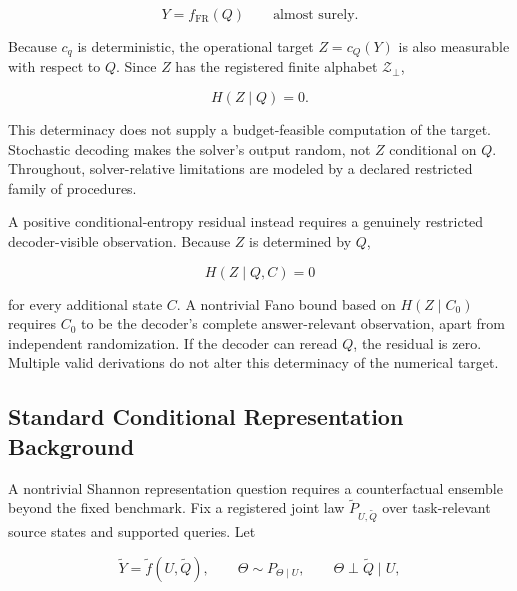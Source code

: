 \documentclass[10pt]{article} %
\providecommand{\1}{\mathbf{1}}  %
\theoremstyle{remark}
\theoremstyle{definition}
\begin{document}
\begin{equation}
Y=f_{\mathrm{FR}}(Q)
\qquad\text{almost surely}.
\label{eq:fixed-benchmark-determinacy}
\end{equation}

Because $c_q$ is deterministic, the operational target $Z=c_Q(Y)$ is also measurable with respect to $Q$. Since $Z$ has the registered finite alphabet $\mathcal Z_{\bot}$,

\begin{equation}
H(Z\mid Q)=0.
\label{eq:fixed-benchmark-zero-entropy}
\end{equation}

This determinacy does not supply a budget-feasible computation of the
target. Stochastic decoding makes the solver's output random, not $Z$
conditional on $Q$. Throughout, solver-relative limitations are modeled
by a declared restricted family of procedures.

A positive conditional-entropy residual instead requires a genuinely
restricted decoder-visible observation. Because $Z$ is determined by
$Q$,

\begin{equation}
H(Z\mid Q,C)=0
\label{eq:answer-determined-with-side-state}
\end{equation}

for every additional state $C$. A nontrivial Fano bound based on
$H(Z\mid C_0)$ requires $C_0$ to be the decoder's complete answer-relevant
observation, apart from independent randomization. If the decoder can
reread $Q$, the residual is zero. Multiple valid derivations do not
alter this determinacy of the numerical target.

\subsection{Standard Conditional Representation Background}
\label{subsec:representation-converses}

A nontrivial Shannon representation question requires a counterfactual ensemble beyond the fixed benchmark. Fix a registered joint law $\widetilde P_{U,\widetilde Q}$ over task-relevant source states and supported queries. Let

\begin{equation}
\widetilde Y
=
\widetilde f(U,\widetilde Q),
\qquad
\Theta\sim P_{\Theta\mid U},
\qquad
\Theta\perp\widetilde Q\mid U,
\label{eq:source-representation-ensemble}
\end{equation}
\end{document}
